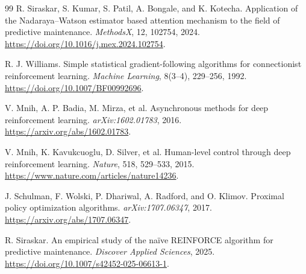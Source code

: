 \documentclass[11pt]{article}
\begin{document}
\begin{thebibliography}{99}
 R. Siraskar, S. Kumar, S. Patil, A. Bongale, and K. Kotecha. Application of the Nadaraya--Watson estimator based attention mechanism to the field of predictive maintenance. \textit{MethodsX}, 12, 102754, 2024. \url{https://doi.org/10.1016/j.mex.2024.102754}.

 R. J. Williams. Simple statistical gradient-following algorithms for connectionist reinforcement learning. \textit{Machine Learning}, 8(3--4), 229--256, 1992. \url{https://doi.org/10.1007/BF00992696}.

 V. Mnih, A. P. Badia, M. Mirza, et al. Asynchronous methods for deep reinforcement learning. \textit{arXiv:1602.01783}, 2016. \url{https://arxiv.org/abs/1602.01783}.

 V. Mnih, K. Kavukcuoglu, D. Silver, et al. Human-level control through deep reinforcement learning. \textit{Nature}, 518, 529--533, 2015. \url{https://www.nature.com/articles/nature14236}.

 J. Schulman, F. Wolski, P. Dhariwal, A. Radford, and O. Klimov. Proximal policy optimization algorithms. \textit{arXiv:1707.06347}, 2017. \url{https://arxiv.org/abs/1707.06347}.

 R. Siraskar. An empirical study of the na\"ive REINFORCE algorithm for predictive maintenance. \textit{Discover Applied Sciences}, 2025. \url{https://doi.org/10.1007/s42452-025-06613-1}.
\end{thebibliography}
\end{document}
